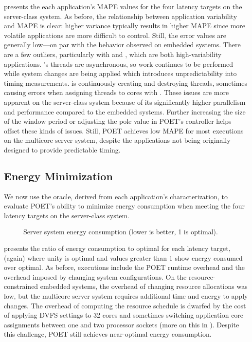  presents the each application's MAPE values for the four latency targets on the server-class system.
As before, the relationship between application variability and MAPE is clear: higher variance typically results in higher MAPE since more volatile applications are more difficult to control.
Still, the error values are generally low---on par with the behavior observed on embedded systems.
There are a few outliers, particularly with  and , which are both high-variability applications.
's threads are asynchronous, so work continues to be performed while system changes are being applied which introduces unpredictability into timing measurements.
 is continuously creating and destroying threads, sometimes causing errors when assigning threads to cores with .
These issues are more apparent on the server-class system because of its significantly higher parallelism and performance compared to the embedded systems.
Further increasing the size of the window period or adjusting the pole value in POET's controller helps offset these kinds of issues.
Still, POET achieves low MAPE for most executions on the multicore server system, despite the applications not being originally designed to provide predictable timing.


\subsection{Energy Minimization}

We now use the oracle, derived from each application's characterization, to evaluate POET's ability to minimize energy consumption when meeting the four latency targets on the server-class system.

\begin{figure}[t]
  \centering
    
  \caption{Server system energy consumption (lower is better, 1 is optimal).}
  \label{fig:poet-server-ee}
\end{figure}

 presents the ratio of energy consumption to optimal for each latency target, (again) where unity is optimal and values greater than 1 show energy consumed over optimal.
As before, executions include the POET runtime overhead and the overhead imposed by changing system configurations.
On the resource-constrained embedded systems, the overhead of changing resource allocations was low, but the multicore server system requires additional time and energy to apply changes.
The overhead of computing the resource schedule is dwarfed by the cost of applying DVFS settings to 32 cores and sometimes switching application core assignments between one and two processor sockets (more on this in ).
Despite this challenge, POET still achieves near-optimal energy consumption.

